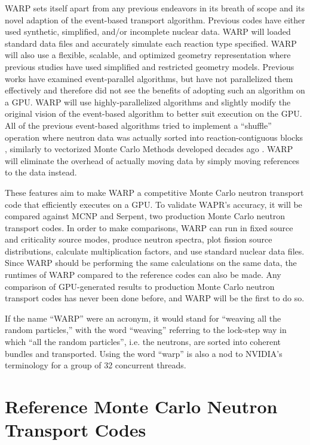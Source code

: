 WARP sets itself apart from any previous endeavors in its breath of scope and its novel adaption of the event-based transport algorithm.  Previous codes have either used synthetic, simplified, and/or incomplete nuclear data.  WARP will loaded standard data files and accurately simulate each reaction type specified.  WARP will also use a flexible, scalable, and optimized geometry representation where previous studies have used simplified and restricted geometry models.  Previous works have examined event-parallel algorithms, but have not parallelized them effectively and therefore did not see the benefits of adopting such an algorithm on a GPU.  WARP will use highly-parallelized algorithms and slightly modify the original vision of the event-based algorithm to better suit execution on the GPU.  All of the previous event-based algorithms tried to implement a ``shuffle'' operation where neutron data was actually sorted into reaction-contiguous blocks \cite{nelson,tianyu_snamc}, similarly to vectorized Monte Carlo Methods developed decades ago \cite{vector,vector_vujic}.  WARP will eliminate the overhead of actually moving data by simply moving references to the data instead.

These features aim to make WARP a competitive Monte Carlo neutron transport code that efficiently executes on a GPU.  To validate WAPR's accuracy, it will be compared against MCNP and Serpent, two production Monte Carlo neutron transport codes.  In order to make comparisons, WARP can run in fixed source and criticality source modes, produce neutron spectra, plot fission source distributions, calculate multiplication factors, and use standard nuclear data files.  Since WARP should be performing the same calculations on the same data, the runtimes of WARP compared to the reference codes can also be made.  Any comparison of GPU-generated results to production Monte Carlo neutron transport codes has never been done before, and WARP will be the first to do so.

If the name ``WARP'' were an acronym, it would stand for ``weaving all the random particles,'' with the word ``weaving'' referring to the lock-step way in which ``all the random particles'', i.e. the neutrons, are sorted into coherent bundles and transported.  Using the word ``warp'' is also a nod to NVIDIA's terminology for a group of 32 concurrent threads.

\section{Reference Monte Carlo Neutron Transport Codes}

